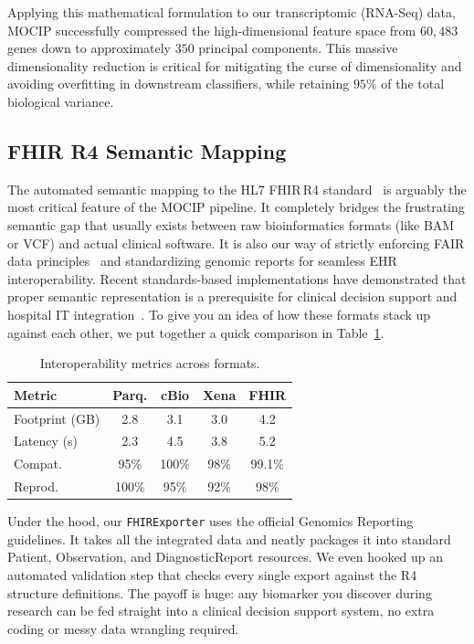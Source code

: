 \documentclass[12pt,a4paper,onecolumn]{article}
\begin{document}
Applying this mathematical formulation to our transcriptomic (RNA-Seq) data, MOCIP successfully compressed the high-dimensional feature space from $60,483$ genes down to approximately $350$ principal components. This massive dimensionality reduction is critical for mitigating the curse of dimensionality and avoiding overfitting in downstream classifiers, while retaining $95\%$ of the total biological variance.

\subsection{FHIR R4 Semantic Mapping}
The automated semantic mapping to the HL7 FHIR\,R4 standard~\cite{hl7fhir} is arguably the most critical feature of the MOCIP pipeline. It completely bridges the frustrating semantic gap that usually exists between raw bioinformatics formats (like BAM or VCF) and actual clinical software. It is also our way of strictly enforcing FAIR data principles~\cite{wilkinson2016} and standardizing genomic reports for seamless EHR interoperability. Recent standards-based implementations have demonstrated that proper semantic representation is a prerequisite for clinical decision support and hospital IT integration~\cite{roberts2024standards,smith2026fhir}. To give you an idea of how these formats stack up against each other, we put together a quick comparison in Table~\ref{tab:export}.


\begin{table}[H]
\caption{Interoperability metrics across formats.}\label{tab:export}
\centering
\scriptsize
\setlength{\tabcolsep}{2pt}
\begin{tabular}{l c c c c}
\toprule
\textbf{Metric} & \textbf{Parq.} & \textbf{cBio} & \textbf{Xena} & \textbf{FHIR} \\
\midrule
Footprint (GB)      & 2.8   & 3.1   & 3.0   & 4.2 \\
Latency (s)         & 2.3   & 4.5   & 3.8   & 5.2 \\
Compat.             & 95\%  & 100\% & 98\%  & 99.1\% \\
Reprod.             & 100\% & 95\%  & 92\%  & 98\% \\
\bottomrule
\end{tabular}
\end{table}

Under the hood, our \texttt{FHIRExporter} uses the official Genomics Reporting guidelines. It takes all the integrated data and neatly packages it into standard Patient, Observation, and DiagnosticReport resources. We even hooked up an automated validation step that checks every single export against the R4 structure definitions. The payoff is huge: any biomarker you discover during research can be fed straight into a clinical decision support system, no extra coding or messy data wrangling required.
\end{document}
